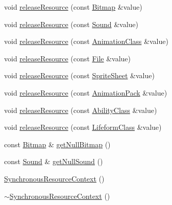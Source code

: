 \begin{DoxyCompactItemize}
\item 
void \hyperlink{classZeta_1_1SynchronousResourceContext_a0cd50c2bb5d7f311d71ad1e9a73e22aa}{release\+Resource} (const \hyperlink{classZeta_1_1Bitmap}{Bitmap} \&value)
\item 
void \hyperlink{classZeta_1_1SynchronousResourceContext_adb54a2cc4768246457180dd309a47179}{release\+Resource} (const \hyperlink{classZeta_1_1Sound}{Sound} \&value)
\item 
void \hyperlink{classZeta_1_1SynchronousResourceContext_a2cb3a0f64ae99ee4ae9b1620cd98af62}{release\+Resource} (const \hyperlink{classZeta_1_1AnimationClass}{Animation\+Class} \&value)
\item 
void \hyperlink{classZeta_1_1SynchronousResourceContext_ae8681d66166117258d6d6cb6cb197532}{release\+Resource} (const \hyperlink{classZeta_1_1File}{File} \&value)
\item 
void \hyperlink{classZeta_1_1SynchronousResourceContext_a12de8f78b89a4d3c811a84f546a17f90}{release\+Resource} (const \hyperlink{classZeta_1_1SpriteSheet}{Sprite\+Sheet} \&value)
\item 
void \hyperlink{classZeta_1_1SynchronousResourceContext_a55dc7d67ee0eaaf7b8e94ac4d86732af}{release\+Resource} (const \hyperlink{classZeta_1_1AnimationPack}{Animation\+Pack} \&value)
\item 
void \hyperlink{classZeta_1_1SynchronousResourceContext_a455a47fc849b9d63aad294ed9e259997}{release\+Resource} (const \hyperlink{classZeta_1_1AbilityClass}{Ability\+Class} \&value)
\item 
void \hyperlink{classZeta_1_1SynchronousResourceContext_ae369199439b45ebde85be03d7f7e259d}{release\+Resource} (const \hyperlink{classZeta_1_1LifeformClass}{Lifeform\+Class} \&value)
\item 
const \hyperlink{classZeta_1_1Bitmap}{Bitmap} \& \hyperlink{classZeta_1_1SynchronousResourceContext_ad4935f0e4ee00502fc1853f3ae60ec36}{get\+Null\+Bitmap} ()
\item 
const \hyperlink{classZeta_1_1Sound}{Sound} \& \hyperlink{classZeta_1_1SynchronousResourceContext_a2ba9b32bec9f2f2bbf7b88d53e861fe5}{get\+Null\+Sound} ()
\item 
\hyperlink{classZeta_1_1SynchronousResourceContext_a5ecdc991243f68323b74346506f05dc1}{Synchronous\+Resource\+Context} ()
\item 
\hyperlink{classZeta_1_1SynchronousResourceContext_a41569cc0d1b917a8e09121393aff0574}{$\sim$\+Synchronous\+Resource\+Context} ()
\end{DoxyCompactItemize}
